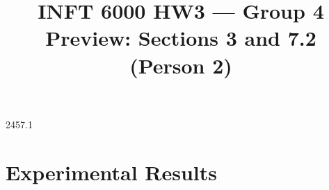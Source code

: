 \documentclass[10pt,twocolumn]{article}
\title{INFT 6000 HW3 --- Group 4\\\large Preview: Sections 3 and 7.2 (Person 2)}
\author{}\date{}
\begin{document}
\maketitle
\makeatletter
\def\ptwostub#1#2{\expandafter\gdef\csname r@#1\endcsname{{#2}{}{}{}{}}}
\ptwostub{sec:architecture}{2}\ptwostub{sec:antientropy}{4}\ptwostub{sec:consensus}{5}\ptwostub{sec:setup}{7.1}
\makeatother
\setcounter{section}{2}

\setcounter{section}{6}
\section{Experimental Results}
\setcounter{subsection}{1}



\end{document}
